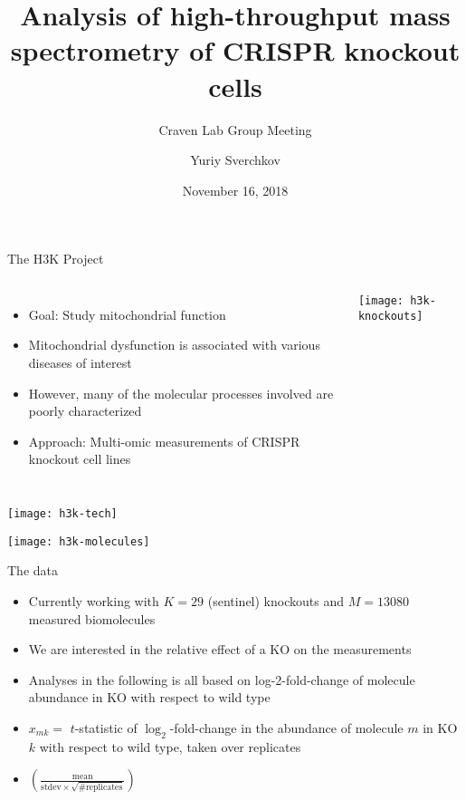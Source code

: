 \documentclass[aspectratio=169]{beamer}
\title{Analysis of high-throughput mass spectrometry of CRISPR knockout cells}
\subtitle{Craven Lab Group Meeting}
\author{Yuriy Sverchkov}
\institute{University of Wisconsin--Madison}
\date{November 16, 2018}
\begin{document}
  {
    \begin{frame}[plain]
      \titlepage
    \end{frame}
  }


\begin{frame}{The H3K Project}
\begin{columns}
\begin{itemize}
	\item Goal: Study mitochondrial function
	\item Mitochondrial dysfunction is associated with various diseases of interest
	\item However, many of the molecular processes involved are poorly characterized
	\item Approach: Multi-omic measurements of CRISPR knockout cell lines
\end{itemize}
\texttt{[image: h3k-knockouts]}
\end{columns}
\end{frame}


\begin{frame}[plain]
\texttt{[image: h3k-tech]}
\end{frame}


\begin{frame}[plain]
\texttt{[image: h3k-molecules]}
\end{frame}


\begin{frame}{The data}
\begin{itemize}
	\item Currently working with $K=29$ (sentinel) knockouts and $M=13080$ measured biomolecules
	\item We are interested in the relative effect of a KO on the measurements
	\item Analyses in the following is all based on log-2-fold-change of molecule abundance in KO with respect to wild type
	\item $x_{mk} =$ $t$-statistic of $\log_2$-fold-change in the abundance of molecule $m$ in KO $k$ with respect to wild type, taken over replicates
	\item[] $\left( \frac{\text{mean}}{\text{stdev}\times \sqrt{\text{\# replicates}} } \right)$
\end{itemize}
\end{frame}
\end{document}
